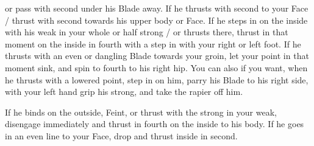 \newpage


\newpage

 
or pass with second under his Blade away. If  he thrusts with second
to your Face / thrust with second towards his upper body or Face. If
he steps in on the inside with his weak in your whole or half strong /
or thrusts there, thrust in that moment on the inside in fourth with a step in
with your right or left foot. If he thrusts with an even or dangling
Blade towards your groin, let your point in that moment sink, and
spin to fourth to his right hip. You can also if you want, when he
thrusts with a lowered point, step in on him, parry his Blade to his
right side, with your left hand grip his strong, and take the rapier
off him.


If he binds on the outside, Feint, or thrust with the strong in your
weak, disengage immediately and thrust in fourth on the inside to his
body. If he goes in an even line to your Face, drop and thrust inside
in second.


